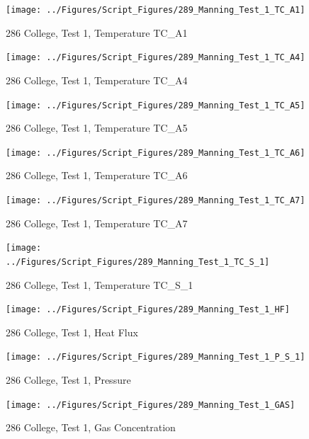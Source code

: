 \documentclass[12pt,oneside]{book}
\begin{document}
\begin{figure}[!ht]
\texttt{[image: ../Figures/Script\_Figures/289\_Manning\_Test\_1\_TC\_A1]}
\caption{286 College, Test 1, Temperature TC\_A1}
\label{fig:289_Manning_Test_1_TC_A1}
\end{figure}

\begin{figure}[!ht]
\texttt{[image: ../Figures/Script\_Figures/289\_Manning\_Test\_1\_TC\_A4]}
\caption{286 College, Test 1, Temperature TC\_A4}
\label{fig:289_Manning_Test_1_TC_A4}
\end{figure}

\begin{figure}[!ht]
\texttt{[image: ../Figures/Script\_Figures/289\_Manning\_Test\_1\_TC\_A5]}
\caption{286 College, Test 1, Temperature TC\_A5}
\label{fig:289_Manning_Test_1_TC_A5}
\end{figure}

\begin{figure}[!ht]
\texttt{[image: ../Figures/Script\_Figures/289\_Manning\_Test\_1\_TC\_A6]}
\caption{286 College, Test 1, Temperature TC\_A6}
\label{fig:289_Manning_Test_1_TC_A6}
\end{figure}

\begin{figure}[!ht]
\texttt{[image: ../Figures/Script\_Figures/289\_Manning\_Test\_1\_TC\_A7]}
\caption{286 College, Test 1, Temperature TC\_A7}
\label{fig:289_Manning_Test_1_TC_A7}
\end{figure}

\begin{figure}[!ht]
\texttt{[image: ../Figures/Script\_Figures/289\_Manning\_Test\_1\_TC\_S\_1]}
\caption{286 College, Test 1, Temperature TC\_S\_1}
\label{fig:289_Manning_Test_1_TC_S_1}
\end{figure}

\begin{figure}[!ht]
\texttt{[image: ../Figures/Script\_Figures/289\_Manning\_Test\_1\_HF]}
\caption{286 College, Test 1, Heat Flux}
\label{fig:289_Manning_Test_1_HF}
\end{figure}

\begin{figure}[!ht]
\texttt{[image: ../Figures/Script\_Figures/289\_Manning\_Test\_1\_P\_S\_1]}
\caption{286 College, Test 1, Pressure}
\label{fig:289_Manning_Test_1_P_S_1}
\end{figure}

\begin{figure}[!ht]
\texttt{[image: ../Figures/Script\_Figures/289\_Manning\_Test\_1\_GAS]}
\caption{286 College, Test 1, Gas Concentration}
\label{fig:289_Manning_Test_1_GAS}
\end{figure}
\end{document}
